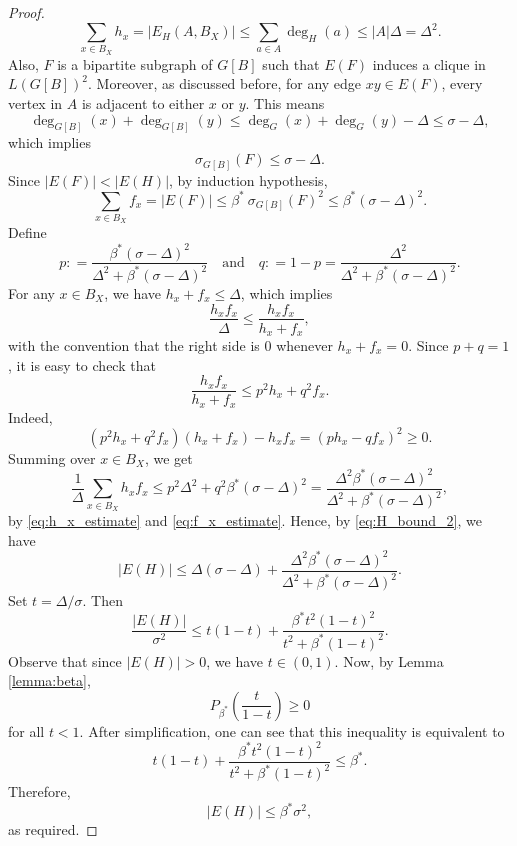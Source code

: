 \documentclass[10pt,a4paper]{amsart}
\begin{document}
\begin{proof}
\begin{equation}\label{eq:h_x_estimate}
  \sum_{x\in B_X} h_x  = |E_H(A, B_X)| \le \sum_{a\in A} \deg_H(a)\le |A|\Delta = \Delta^2.  
\end{equation}
Also, $F$ is a bipartite subgraph of $G[B]$ such that $E(F)$ induces a clique in $L(G[B])^2$. Moreover, as discussed before, for any edge $xy\in E(F)$, every vertex in $A$ is adjacent to either $x$ or $y$. This means
\[ \deg_{G[B]}(x) + \deg_{G[B]}(y) \le \deg_G(x) + \deg_{G}(y) - \Delta \le \sigma - \Delta,\]
which implies 
\[ \sigma_{G[B]}(F) \le \sigma - \Delta.\]
Since $|E(F)| < |E(H)|$, by induction hypothesis,
\begin{equation}\label{eq:f_x_estimate}
   \sum_{x\in B_X}f_x = |E(F)|\le \beta^*\ \sigma_{G[B]}(F)^2 \le \beta^* (\sigma - \Delta)^2. 
\end{equation}
Define 
\[ p: = \frac{\beta^*(\sigma-\Delta)^2}{\Delta^2 + \beta^*(\sigma-\Delta)^2} \quad \text{and} \quad q: = 1-p = \frac{\Delta^2}{\Delta^2 +\beta^*(\sigma-\Delta)^2}.\]
For any $x\in B_X$, we have $h_x + f_x \le \Delta$, which implies 
\[
   \frac{h_xf_x}{\Delta}
   \le
   \frac{h_xf_x}{h_x+f_x},
\]
with the convention that the right side is $0$ whenever $h_x + f_x = 0$. Since $p + q = 1$, it is easy to check that 
\[    \frac{h_xf_x}{h_x+f_x} \le p^2 h_x + q^2 f_x.\]
Indeed, 
\[ (p^2 h_x + q^2 f_x)(h_x + f_x) - h_xf_x = (ph_x - qf_x)^2 \ge 0.\]
Summing over $x\in B_X$, we get
\[ \frac{1}{\Delta}\sum_{x\in B_X}h_xf_x \le  p^2 \Delta^2 + q^2 \beta^* (\sigma - \Delta)^2 = \frac{\Delta^2\beta^*(\sigma-\Delta)^2}{\Delta^2 + \beta^*(\sigma-\Delta)^2},\]
by \eqref{eq:h_x_estimate} and \eqref{eq:f_x_estimate}. Hence, by \eqref{eq:H_bound_2}, we have
\[
   |E(H)| \le \Delta(\sigma-\Delta) + \frac{\Delta^2\beta^*(\sigma-\Delta)^2}{\Delta^2 + \beta^*(\sigma-\Delta)^2}.
\]
Set $t=\Delta/\sigma$. Then
\[
   \frac{|E(H)|}{\sigma^2}
   \le
   t(1-t)+
   \frac{\beta^* t^2(1-t)^2}{t^2+\beta^*(1-t)^2}.
\]
Observe that since $|E(H)|>0$, we have $t\in (0,1)$. Now, by Lemma \ref{lemma:beta}, 
\[P_{\beta^*}\left(\frac{t}{1-t}\right)\ge 0\] for all $t<1$. After simplification, one can see that this inequality is equivalent to 
\[t(1-t)+
   \frac{\beta^* t^2(1-t)^2}{t^2+\beta^*(1-t)^2}\le \beta^*. 
\]
Therefore,
\[
   |E(H)|\le \beta^*\sigma^2,
\]
as required.
\end{proof}
\end{document}
